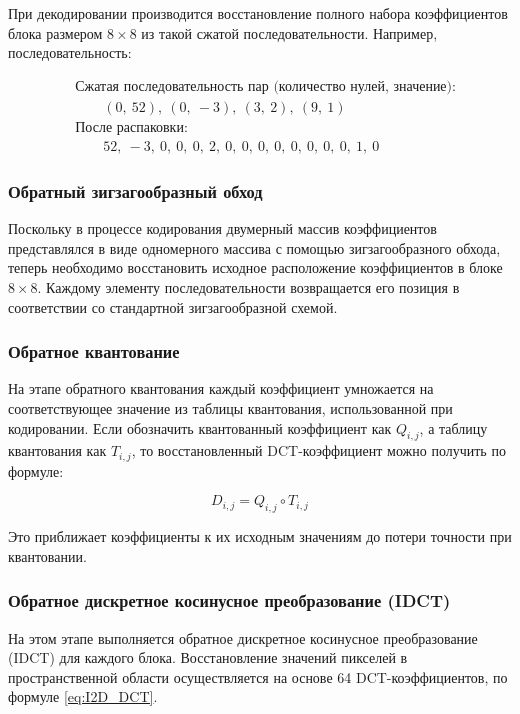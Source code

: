 При декодировании производится восстановление полного набора коэффициентов блока размером $8 \times 8$
из такой сжатой последовательности. Например, последовательность:

\begin{equation}
    \label{eq:rle_example}
    \begin{aligned}
        &\text{Сжатая последовательность пар (количество нулей, значение):} \\
        &\qquad (0,\ 52),\ (0,\ -3),\ (3,\ 2),\ (9,\ 1) \\
        &\text{После распаковки:} \\
        &\qquad 52,\ -3,\ 0,\ 0,\ 0,\ 2,\ 0,\ 0,\ 0,\ 0,\ 0,\ 0,\ 0,\ 0,\ 1,\ 0
    \end{aligned}
\end{equation}



\subsubsection{Обратный зигзагообразный обход}
Поскольку в процессе кодирования двумерный массив коэффициентов представлялся в виде одномерного массива 
с помощью зигзагообразного обхода, теперь необходимо восстановить исходное расположение коэффициентов в блоке $8 \times 8$. 
Каждому элементу последовательности возвращается его позиция в соответствии со стандартной зигзагообразной схемой.




\subsubsection{Обратное квантование}
На этапе обратного квантования каждый коэффициент умножается на соответствующее значение из таблицы квантования, 
использованной при кодировании. Если обозначить квантованный коэффициент как $Q_{i,j}$, а таблицу квантования как $T_{i,j}$,
то восстановленный DCT-коэффициент можно получить по формуле:

\begin{equation}
    D_{i,j} = Q_{i,j} \circ T_{i,j}
\end{equation}

Это приближает коэффициенты к их исходным значениям до потери точности при квантовании.




\subsubsection{Обратное дискретное косинусное преобразование (IDCT)}
На этом этапе выполняется обратное дискретное косинусное преобразование (IDCT) для каждого блока. 
Восстановление значений пикселей в пространственной области осуществляется на основе 64 DCT-коэффициентов, по формуле \eqref{eq:I2D_DCT}.


